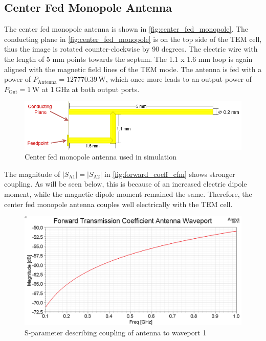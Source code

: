 \subsection{Center Fed Monopole Antenna}

The center fed monopole antenna is shown in \autoref{fig:center_fed_monopole}. The conducting plane in \autoref{fig:center_fed_monopole} is on the top side of the TEM cell, thus the image is rotated counter-clockwise by 90 degrees. The electric wire with the length of 5 mm points towards the septum. The 1.1 x 1.6 mm loop is again aligned with the magnetic field lines of the TEM mode. The antenna is fed with a power of $P_\mathrm{Antenna}=127770.39\,\mathrm{W}$, which once more leads to an output power of $P_\mathrm{Out}=1\,\mathrm{W}$ at 1\,GHz at both output ports. 

\begin{figure}[h]
    \centering
    \includegraphics[width=0.75\linewidth]{Documentation//content//30_simulations//img/center_fed_monopole.png}
    \caption{Center fed monopole antenna used in simulation}
    \label{fig:center_fed_monopole}
\end{figure}

The magnitude of $|S_\mathrm{A1}|=|S_\mathrm{A2}|$ in \autoref{fig:forward_coeff_cfm} shows stronger coupling. As will be seen below, this is because of an increased electric dipole moment, while the magnetic dipole moment remained the same. Therefore, the center fed monopole antenna couples well electrically with the TEM cell.

\begin{figure}[h]
    \centering
    \includegraphics[width=1\linewidth]{Documentation//content//30_simulations//img/forward_coeff_cfm.png}
    \caption{S-parameter describing coupling of antenna to waveport 1}
    \label{fig:forward_coeff_cfm}
\end{figure}

